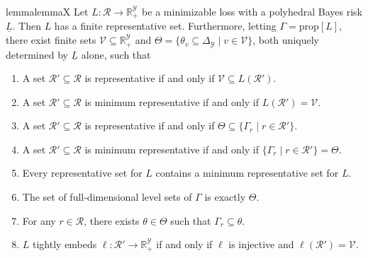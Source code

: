 \documentclass[11pt]{article}
\newcommand{\reals}{\mathbb{R}}
\newcommand{\prop}[1]{\mathrm{prop}[#1]}
\newcommand{\simplex}{\Delta_\Y}
\newcommand{\R}{\mathcal{R}}
\newcommand{\V}{\mathcal{V}}
\newcommand{\Y}{\mathcal{Y}}
\newcommand{\risk}[1]{\underline{#1}}
\begin{document}
\begin{restatable}{lemma}{lemmaX}\label{lem:X}
  Let $L: \R \to \reals^\Y_+$ be a minimizable loss with a polyhedral Bayes risk $\risk L$.
  Then $L$ has a finite representative set.
  Furthermore, letting $\Gamma = \prop{L}$, there exist finite sets
  $\V \subseteq \reals^\Y_+$ and
  $\Theta = \{\theta_v \subseteq \simplex \mid v\in\V\}$,
  both uniquely determined by $\risk{L}$ alone,
  such that
  \begin{enumerate}
  \item A set $\R'\subseteq\R$ is representative if and only if $\V \subseteq L(\R')$.\label{item:X-rep-V}
  \item A set $\R'\subseteq\R$ is minimum representative if and only if $L(\R') = \V$.\label{item:X-min-V}
  \item A set $\R'\subseteq\R$ is representative if and only if $\Theta \subseteq \{\Gamma_r \mid r \in \R'\}$.\label{item:X-rep-Theta}
  \item A set $\R'\subseteq\R$ is minimum representative if and only if $\{\Gamma_r \mid r \in \R'\} = \Theta$.\label{item:X-min-Theta}
  \item Every representative set for $L$ contains a minimum representative set for $L$.\label{item:X-rep-contain-min}
  \item The set of full-dimensional level sets of $\Gamma$ is exactly $\Theta$.\label{item:X-full-dim}
  \item For any $r \in \R$, there exists $\theta \in \Theta$ such that $\Gamma_r \subseteq \theta$.\label{item:X-redundant}
  \item $L$ tightly embeds $\ell:\R'\to\reals^\Y_+$ if and only if $\ell$ is injective and $\ell(\R') = \V$.\label{item:X-tight-embed}
  \end{enumerate}
\end{restatable}
\end{document}
